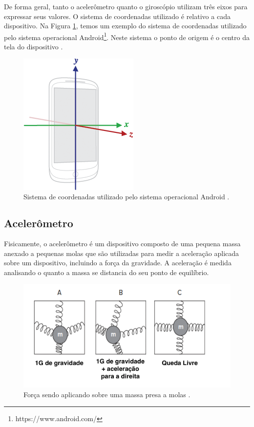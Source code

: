 De forma geral, tanto o acelerômetro quanto o giroscópio utilizam três eixos para expressar seus valores. O sistema de coordenadas utilizado é relativo a cada dispositivo. Na Figura \ref{fig:axis_device}, temos um exemplo do sistema de coordenadas utilizado pelo sistema operacional Android\footnote{https://www.android.com/}. Neste sistema o ponto de origem é o centro da tela do dispositivo \citep{sensorAndroidDocs}. 

\begin{figure}[ht]
	\centering
	\includegraphics[scale=0.6]{imagens/axis_device.png}
	\caption{Sistema de coordenadas utilizado pelo sistema operacional Android \citep{sensorAndroidDocs}.}
	\label{fig:axis_device}
\end{figure} 

\subsection{Acelerômetro}
\label{subsec:accelerometer}
Fisicamente, o acelerômetro é um dispositivo composto de uma pequena massa  anexado a pequenas molas que são utilizadas para medir a aceleração aplicada sobre um dispositivo, incluindo a força da gravidade. A aceleração é medida analisando o quanto a massa se distancia do seu ponto de equilíbrio. 

\begin{figure}[ht]
	\centering
	\includegraphics[scale=0.6]{imagens/MEMS_device.png}
	\caption{Força sendo aplicando sobre uma massa presa a molas \citep{milette2012professional}.}
	\label{fig:acelerometro}
\end{figure} 

